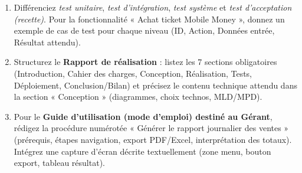 \documentclass[11pt]{article}
\begin{document}
\begin{exercice}
\begin{enumerate}
    \item Différenciez \textit{test unitaire}, \textit{test d'intégration}, \textit{test système} et \textit{test d'acceptation (recette)}. Pour la fonctionnalité « Achat ticket Mobile Money », donnez un exemple de cas de test pour chaque niveau (ID, Action, Données entrée, Résultat attendu).
    \item Structurez le \textbf{Rapport de réalisation} : listez les 7 sections obligatoires (Introduction, Cahier des charges, Conception, Réalisation, Tests, Déploiement, Conclusion/Bilan) et précisez le contenu technique attendu dans la section « Conception » (diagrammes, choix technos, MLD/MPD).
    \item Pour le \textbf{Guide d'utilisation (mode d'emploi) destiné au Gérant}, rédigez la procédure numérotée « Générer le rapport journalier des ventes » (prérequis, étapes navigation, export PDF/Excel, interprétation des totaux). Intégrez une capture d'écran décrite textuellement (zone menu, bouton export, tableau résultat).
\end{enumerate}
\end{exercice}
\end{document}
